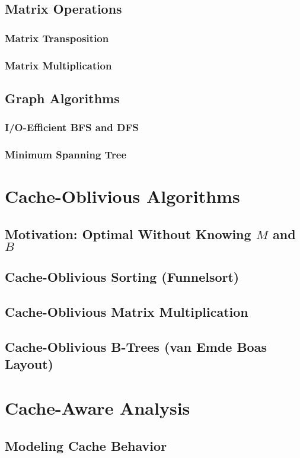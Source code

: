 \subsection{Matrix Operations}
\subsubsection{Matrix Transposition}
\subsubsection{Matrix Multiplication}
\subsection{Graph Algorithms}
\subsubsection{I/O-Efficient BFS and DFS}
\subsubsection{Minimum Spanning Tree}

\section{Cache-Oblivious Algorithms}
\subsection{Motivation: Optimal Without Knowing $M$ and $B$}
\subsection{Cache-Oblivious Sorting (Funnelsort)}
\subsection{Cache-Oblivious Matrix Multiplication}
\subsection{Cache-Oblivious B-Trees (van Emde Boas Layout)}

\section{Cache-Aware Analysis}
\subsection{Modeling Cache Behavior}
